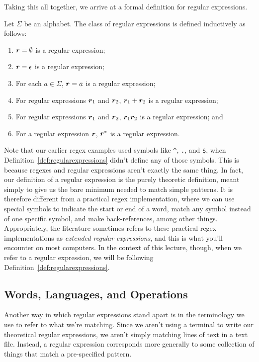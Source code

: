 Taking this all together, we arrive at a formal definition for regular expressions.

\begin{definition}\label{def:regularexpressions}
Let $\Sigma$ be an alphabet. The class of regular expressions is defined inductively as follows:
\begin{enumerate}
\item $\bm r = \emptyset$ is a regular expression;
\item $\bm r = \epsilon$ is a regular expression;
\item For each $a \in \Sigma$, $\bm r = a$ is a regular expression;
\item For regular expressions $\bm r_{1}$ and $\bm r_{2}$, $\bm r_{1} + \bm r_{2}$ is a regular expression;
\item For regular expressions $\bm r_{1}$ and $\bm r_{2}$, $\bm r_{1}\bm r_{2}$ is a regular expression; and
\item For a regular expression $\bm r$, $\bm r^{*}$ is a regular expression.
\end{enumerate}
\end{definition}

Note that our earlier regex examples used symbols like \texttt{\^}, \texttt{.}, and \texttt{\$}, when Definition~\ref{def:regularexpressions} didn't define any of those symbols. This is because regexes and regular expressions aren't exactly the same thing. In fact, our definition of a regular expression is the purely theoretic definition, meant simply to give us the bare minimum needed to match simple patterns. It is therefore different from a practical regex implementation, where we can use special symbols to indicate the start or end of a word, match any symbol instead of one specific symbol, and make back-references, among other things. Appropriately, the literature sometimes refers to these practical regex implementations as \emph{extended regular expressions}, and this is what you'll encounter on most computers. In the context of this lecture, though, when we refer to a regular expression, we will be following Definition~\ref{def:regularexpressions}.

\subsection{Words, Languages, and Operations}

Another way in which regular expressions stand apart is in the terminology we use to refer to what we're matching. Since we aren't using a terminal to write our theoretical regular expressions, we aren't simply matching lines of text in a text file. Instead, a regular expression corresponds more generally to some collection of things that match a pre-specified pattern.

